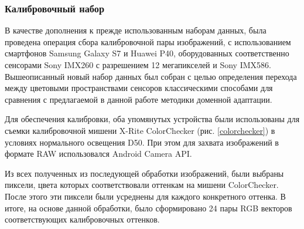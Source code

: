 \subsubsection{Калибровочный набор}\label{sec:calibration-dataset}

В качестве дополнения к прежде использованным наборам данных, была проведена операция сбора калибровочной пары изображений, с использованием смартфонов Samsung Galaxy S7 и Huawei P40, оборудованных соответственно сенсорами Sony IMX260 с разрешением 12 мегапикселей и Sony IMX586. Вышеописанный новый набор данных был собран с целью определения перехода между цветовыми пространствами  сенсоров классическими способами для сравнения с предлагаемой в данной работе методики доменной адаптации.


Для обеспечения калибровки, оба упомянутых устройства были использованы для съемки калибровочной мишени X-Rite ColorChecker (рис. \ref{colorchecker}) в условиях нормального освещения D50. При этом для захвата изображений в формате RAW использовался Android Camera API.

Из всех полученных из последующей обработки изображений, были выбраны пиксели, цвета которых соответствовали оттенкам на мишени ColorChecker. После этого эти пиксели были усреднены для каждого конкретного оттенка. В итоге, на основе данной обработки, было сформировано 24 пары RGB векторов соответствующих калибровочных оттенков.

